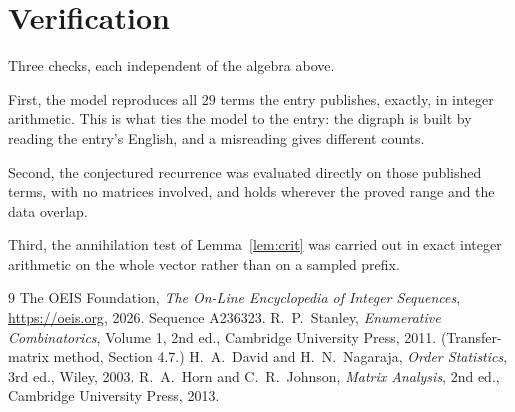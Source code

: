 \documentclass[11pt,a4paper]{article}
\theoremstyle{plain}
\theoremstyle{definition}
\begin{document}
\section{Verification}

Three checks, each independent of the algebra above.

First, the model reproduces all $29$ terms the entry publishes, exactly, in integer
arithmetic. This is what ties the model to the entry: the digraph is built by reading the
entry's English, and a misreading gives different counts.

Second, the conjectured recurrence was evaluated directly on those published terms, with no
matrices involved, and holds wherever the proved range and the data overlap.

Third, the annihilation test of Lemma~\ref{lem:crit} was carried out in exact integer
arithmetic on the whole vector rather than on a sampled prefix.

\begin{thebibliography}{9}
 The OEIS Foundation, \emph{The On-Line Encyclopedia of Integer
Sequences}, \url{https://oeis.org}, 2026. Sequence A236323.
 R.~P.~Stanley, \emph{Enumerative Combinatorics}, Volume 1, 2nd ed.,
Cambridge University Press, 2011. (Transfer-matrix method, Section 4.7.)
 H.~A.~David and H.~N.~Nagaraja, \emph{Order Statistics}, 3rd ed., Wiley,
2003.
 R.~A.~Horn and C.~R.~Johnson, \emph{Matrix Analysis}, 2nd ed., Cambridge
University Press, 2013.
\end{thebibliography}
\end{document}
